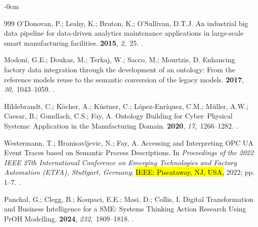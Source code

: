 \documentclass[systems,article,accept,pdftex,moreauthors]{Definitions/mdpi}
\begin{document}
\begin{adjustwidth}{-\extralength}{0cm}
\begin{thebibliography}{999}
O'Donovan, P.; Leahy, K.; Bruton, K.; O'Sullivan, D.T.J.
\newblock An industrial big data pipeline for data-driven analytics maintenance
  applications in large-scale smart manufacturing facilities.
 {\bf 2015}, {\em 2},~25.
.

Modoni, G.E.; Doukas, M.; Terkaj, W.; Sacco, M.; Mourtzis, D.
\newblock Enhancing factory data integration through the development of an
  ontology: From the reference models reuse to the semantic conversion of the
  legacy models.
 {\bf 2017}, {\em
  30},~1043--1059.
.

Hildebrandt, C.; K{\"o}cher, A.; K{\"u}stner, C.; L{\'o}pez-Enr{\'i}quez, C.M.;
  M{\"u}ller, A.W.; Caesar, B.; Gundlach, C.S.; Fay, A.
\newblock Ontology Building for Cyber--Physical Systems: Application in the
  Manufacturing Domain.
 {\bf 2020}, {\em 17},~1266--1282.
.

Westermann, T.; Hranisavljevic, N.; Fay, A.
\newblock Accessing and Interpreting OPC UA Event Traces based on Semantic
  Process Descriptions.
\newblock In \textit{Proceedings of the 2022 IEEE 27th International Conference on
  Emerging Technologies and Factory Automation (ETFA), Stuttgart, Germany};
   \hl{IEEE: Piscataway, NJ, USA,} %
   2022; pp. 1--7.
.

Panchal, G.; Clegg, B.; Koupaei, E.E.; Masi, D.; Collis, I.
\newblock Digital Transformation and Business Intelligence for a SME: Systems
  Thinking Action Research Using PrOH Modelling.
 {\bf 2024}, {\em 232},~1809--1818.
.


\end{thebibliography}
\end{adjustwidth}
\end{document}
